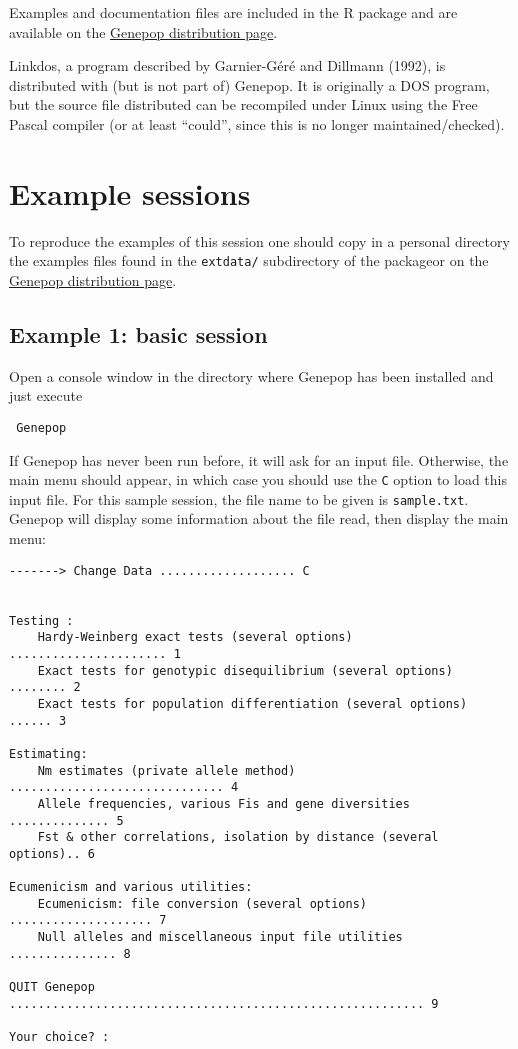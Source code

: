 \documentclass[12pt,]{book}
\begin{document}
Examples and documentation files are included in the R package and are
available on the
\href{http://kimura.univ-montp2.fr/~rousset/Genepop.htm}{Genepop
distribution page}.

Linkdos, a program described by Garnier-Géré and
Dillmann (1992), is distributed with (but is not part of) Genepop. It is
originally a DOS program, but the source file distributed can be
recompiled under Linux using the Free Pascal compiler (or at least
``could'', since this is no longer maintained/checked).

\section{Example sessions}\label{example-sessions}

To reproduce the examples of this session one should copy in a personal
directory the examples files found in the \texttt{extdata/} subdirectory
of the packageor on the
\href{http://kimura.univ-montp2.fr/~rousset/Genepop.htm}{Genepop
distribution page}.

\subsection{Example 1: basic session}\label{example-1-basic-session}

Open a console window in the directory where Genepop has been installed
and just execute

\begin{verbatim}
 Genepop
\end{verbatim}

If Genepop has never been run before, it will ask for an input file.
Otherwise, the main menu should appear, in which case you should use the
\texttt{C} option to load this input file. For this sample session, the
file name to be given is \texttt{sample.txt}. Genepop will display some
information about the file read, then display the main menu:

\begin{verbatim}
-------> Change Data ................... C


Testing :
    Hardy-Weinberg exact tests (several options) ...................... 1
    Exact tests for genotypic disequilibrium (several options) ........ 2
    Exact tests for population differentiation (several options) ...... 3

Estimating:
    Nm estimates (private allele method) .............................. 4
    Allele frequencies, various Fis and gene diversities .............. 5
    Fst & other correlations, isolation by distance (several options).. 6

Ecumenicism and various utilities:
    Ecumenicism: file conversion (several options) .................... 7
    Null alleles and miscellaneous input file utilities ............... 8

QUIT Genepop .......................................................... 9

Your choice? :
\end{verbatim}
\end{document}
